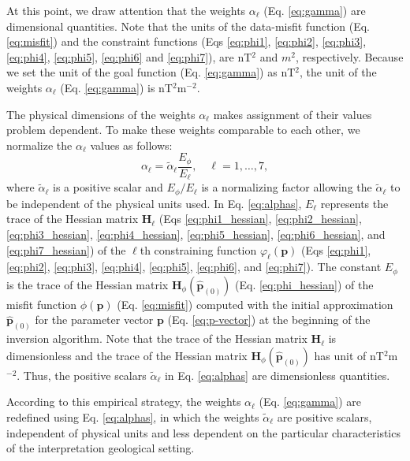 At this point, we draw attention that the weights $ \alpha_{\ell}$ (Eq. \ref{eq:gamma}) are dimensional quantities. 
Note that the units of the data-misfit function (Eq. \ref{eq:misfit}) and the constraint functions 
(Eqs \ref{eq:phi1}, \ref{eq:phi2}, \ref{eq:phi3}, \ref{eq:phi4}, \ref{eq:phi5}, 
\ref{eq:phi6} and \ref{eq:phi7}), are nT$^{2}$ and $m^{2}$, respectively.
Because we set the unit of the goal function (Eq. \ref{eq:gamma}) as nT$^{2}$, the unit of the weights 
$ \alpha_{\ell} $ (Eq. \ref{eq:gamma}) is nT$^{2}$m$^{-2}$.

The physical dimensions of the weights $ \alpha_{\ell}$ makes assignment of 
their values problem dependent. 
To make these weights comparable to each other, we normalize the $ \alpha_{\ell} $ 
values as follows:
\begin{equation}\label{eq:alphas}
\alpha_{\ell} = \tilde{\alpha}_\ell \frac{E_\phi}{E_\ell}, \quad \ell = 1,\dots, 7,
\end{equation}
where $\tilde{\alpha}_\ell$ is a positive scalar and $ E_\phi/E_\ell $ is a normalizing
factor allowing the $\tilde{\alpha}_\ell$ to be independent of the physical units used.
In Eq. \ref{eq:alphas}, $ E_\ell $ represents the 
trace of the Hessian matrix $\mathbf{H}_{\ell}$ (Eqs \ref{eq:phi1_hessian}, 
\ref{eq:phi2_hessian}, \ref{eq:phi3_hessian}, \ref{eq:phi4_hessian}, \ref{eq:phi5_hessian}, 
\ref{eq:phi6_hessian}, and \ref{eq:phi7_hessian}) of the $\ell$th constraining function 
$\varphi_{\ell}(\mathbf{p})$ (Eqs \ref{eq:phi1}, \ref{eq:phi2}, \ref{eq:phi3}, 
\ref{eq:phi4}, \ref{eq:phi5}, \ref{eq:phi6}, and \ref{eq:phi7}). 
The constant $E_\phi$ is the trace of the Hessian matrix 
$\mathbf{H}_{\phi}(\hat{\mathbf{p}}_{(0)})$ (Eq. \ref{eq:phi_hessian}) of the misfit function 
$\phi(\mathbf{p})$ (Eq. \ref{eq:misfit}) computed with the initial approximation $\hat{\mathbf{p}}_{(0)}$ 
for the parameter vector $ \mathbf{p} $ (Eq. \ref{eq:p-vector}) at the beginning of the inversion algorithm. 
Note that the trace of the Hessian matrix $\mathbf{H}_{\ell}$ is dimensionless and 
the trace of the Hessian matrix $\mathbf{H}_{\phi}(\hat{\mathbf{p}}_{(0)})$ has unit of nT$^{2}$m$^{-2}$.
Thus, the positive scalars $\tilde{\alpha}_\ell$ in Eq. \ref{eq:alphas} are dimensionless quantities.

According to this empirical strategy, the weights $ \alpha_{\ell} $ 
(Eq. \ref{eq:gamma}) are redefined using Eq. \ref{eq:alphas}, in which the weights
$\tilde{\alpha}_\ell$ are positive scalars, independent of physical units and 
less dependent on the particular characteristics of the
interpretation geological setting.


